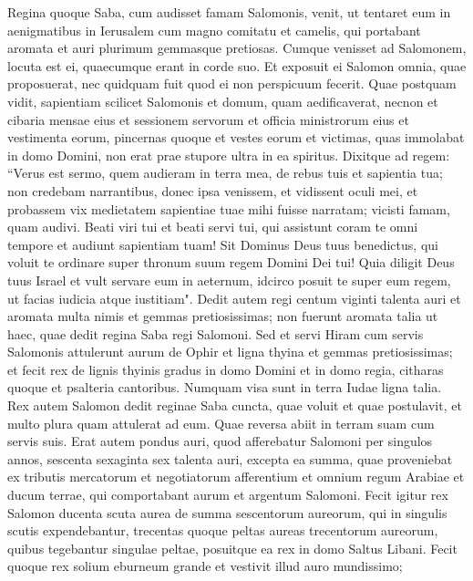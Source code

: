 \begin{biblechapter}  
\verse Regina quoque Saba, cum audisset famam Salomonis, venit, ut tentaret eum in aenigmatibus in Ierusalem cum magno comitatu et camelis, qui portabant aromata et auri plurimum gemmasque pretiosas. Cumque venisset ad Salomonem, locuta est ei, quaecumque erant in corde suo. 
\verse Et exposuit ei Salomon omnia, quae proposuerat, nec quidquam fuit quod ei non perspicuum fecerit. 
\verse Quae postquam vidit, sapientiam scilicet Salomonis et domum, quam aedificaverat, 
\verse necnon et cibaria mensae eius et sessionem servorum et officia ministrorum eius et vestimenta eorum, pincernas quoque et vestes eorum et victimas, quas immolabat in domo Domini, non erat prae stupore ultra in ea spiritus. 
\verse Dixitque ad regem: “Verus est sermo, quem audieram in terra mea, de rebus tuis et sapientia tua; 
\verse non credebam narrantibus, donec ipsa venissem, et vidissent oculi mei, et probassem vix medietatem sapientiae tuae mihi fuisse narratam; vicisti famam, quam audivi. 
\verse Beati viri tui et beati servi tui, qui assistunt coram te omni tempore et audiunt sapientiam tuam! 
\verse Sit Dominus Deus tuus benedictus, qui voluit te ordinare super thronum suum regem Domini Dei tui! Quia diligit Deus tuus Israel et vult servare eum in aeternum, idcirco posuit te super eum regem, ut facias iudicia atque iustitiam". 
\verse Dedit autem regi centum viginti talenta auri et aromata multa nimis et gemmas pretiosissimas; non fuerunt aromata talia ut haec, quae dedit regina Saba regi Salomoni. 
\verse Sed et servi Hiram cum servis Salomonis attulerunt aurum de Ophir et ligna thyina et gemmas pretiosissimas; 
\verse et fecit rex de lignis thyinis gradus in domo Domini et in domo regia, citharas quoque et psalteria cantoribus. Numquam visa sunt in terra Iudae ligna talia. 
\verse Rex autem Salomon dedit reginae Saba cuncta, quae voluit et quae postulavit, et multo plura quam attulerat ad eum. Quae reversa abiit in terram suam cum servis suis. 
\verse Erat autem pondus auri, quod afferebatur Salomoni per singulos annos, sescenta sexaginta sex talenta auri, 
\verse excepta ea summa, quae proveniebat ex tributis mercatorum et negotiatorum afferentium et omnium regum Arabiae et ducum terrae, qui comportabant aurum et argentum Salomoni. 
\verse Fecit igitur rex Salomon ducenta scuta aurea de summa sescentorum aureorum, qui in singulis scutis expendebantur, 
\verse trecentas quoque peltas aureas trecentorum aureorum, quibus tegebantur singulae peltae, posuitque ea rex in domo Saltus Libani. 
\verse Fecit quoque rex solium eburneum grande et vestivit illud auro mundissimo;  

\end{biblechapter}
